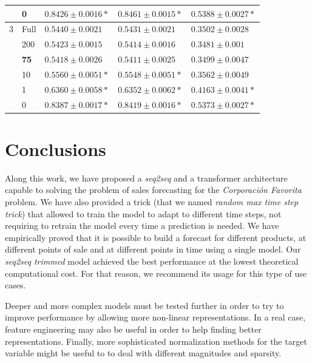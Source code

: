 \begin{table}[!h]
\begin{tabular}{lllll}
      & 0               & $ 0.8426 \pm 0.0016 *$          & $ 0.8461 \pm 0.0015 *$         & $ 0.5388 \pm 0.0027 *$          \\ \hline
		3      & Full            & $ 0.5440 \pm 0.0021 $           & $ 0.5431 \pm 0.0021 $          & $ 0.3502 \pm 0.0028 $          \\
      & 200             & $ 0.5423 \pm 0.0015 $           & $ 0.5414 \pm 0.0016 $          & $ 0.3481 \pm 0.001 $           \\
      & \textbf{75}     & $ \mathbf{0.5418 \pm 0.0026} $  & $ \mathbf{0.5411 \pm 0.0025} $ & $ \mathbf{0.3499 \pm 0.0047} $ \\
      & 10              & $ 0.5560 \pm 0.0051 *$          & $ 0.5548 \pm 0.0051 *$         & $ 0.3562 \pm 0.0049 $          \\
      & 1               & $ 0.6360 \pm 0.0058 *$          & $ 0.6352 \pm 0.0062 *$         & $ 0.4163 \pm 0.0041 *$          \\
      & 0               & $ 0.8387 \pm 0.0017 *$          & $ 0.8419 \pm 0.0016 *$         & $ 0.5373 \pm 0.0027 *$          \\ \hline
	\end{tabular}
\end{table}

\section{Conclusions} \label{sec:conclusions}

Along this work, we have proposed a \textit{seq2seq} and a transformer architecture capable to solving the problem of sales forecasting for the \textit{Corporación Favorita} problem. We have also provided a trick (that we named \textit{random max time step trick}) that allowed to train the model to adapt to different time steps, not requiring to retrain the model every time a prediction is needed. We have empirically proved that it is possible to build a forecast for different products, at different points of sale and at different points in time using a single model. Our \textit{seq2seq trimmed} model achieved the best performance at the lowest theoretical computational cost. For that reason, we recommend its usage for this type of use cases.

Deeper and more complex models must be tested further in order to try to improve performance by allowing more non-linear representations. In a real case, feature engineering may also be useful in order to help finding better representations. Finally, more sophisticated normalization methods for the target variable might be useful to to deal with different magnitudes and sparsity.

